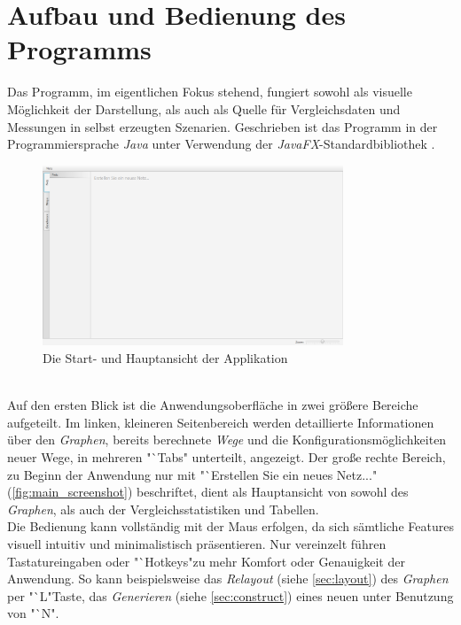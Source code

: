 \documentclass[12pt]{article}
\begin{document}
\section{Aufbau und Bedienung des Programms}
\label{sec:manual}
Das Programm, im eigentlichen Fokus stehend, fungiert sowohl als visuelle Möglichkeit der Darstellung, als auch als Quelle für Vergleichsdaten und Messungen in selbst erzeugten Szenarien.
Geschrieben ist das Programm in der Programmiersprache \textit{Java} unter Verwendung der \textit{JavaFX}-Standardbibliothek \cite{javafx}.
\begin{figure}[h!]
\includegraphics[width=0.8\textwidth]{res/main_screenshot.png}
\centering
\caption{Die Start- und Hauptansicht der Applikation}
\label{fig:main_screenshot}
\end{figure}
\\
Auf den ersten Blick ist die Anwendungsoberfläche in zwei größere Bereiche aufgeteilt. Im linken, kleineren Seitenbereich werden detaillierte Informationen über den \textit{Graphen}, bereits berechnete \textit{Wege} und 
die Konfigurationsmöglichkeiten neuer Wege, in mehreren "`Tabs" unterteilt, angezeigt. Der große rechte Bereich, zu Beginn der Anwendung nur mit "`Erstellen Sie ein neues Netz..." (\autoref{fig:main_screenshot}) 
beschriftet, dient als Hauptansicht von sowohl des \textit{Graphen}, als auch der Vergleichsstatistiken und Tabellen.
\\
Die Bedienung kann vollständig mit der Maus erfolgen, da sich sämtliche Features visuell intuitiv und minimalistisch präsentieren. Nur vereinzelt führen Tastatureingaben oder "`Hotkeys"\;zu mehr Komfort oder Genauigkeit 
der Anwendung. So kann beispielsweise das \textit{Relayout} (siehe \autoref{sec:layout}) des \textit{Graphen} per "`L"\;Taste, das \textit{Generieren} (siehe \autoref{sec:construct}) eines neuen unter Benutzung 
von "`N".
\\
\newpage
\end{document}
